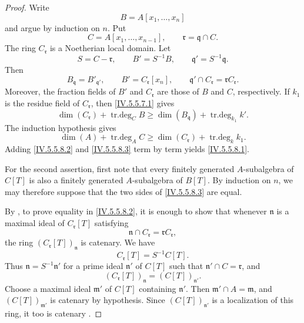 \begin{proof}

Write
\[
B=A[x_1,\ldots,x_n]
\]
and argue by induction on $n$.
Put
\[
C=A[x_1,\ldots,x_{n-1}],
\qquad
\mathfrak r=\mathfrak q\cap C.
\]
The ring $C_{\mathfrak r}$ is a Noetherian local domain.
Let
\[
S=C-\mathfrak r,\qquad
B'=S^{-1}B,\qquad
\mathfrak q'=S^{-1}\mathfrak q.
\]
Then
\[
B_{\mathfrak q}=B'_{\mathfrak q'},
\qquad
B'=C_{\mathfrak r}[x_n],
\qquad
\mathfrak q'\cap C_{\mathfrak r}
  =\mathfrak rC_{\mathfrak r}.
\]
Moreover, the fraction fields of $B'$ and $C_{\mathfrak r}$ are
those of $B$ and $C$, respectively.
If $k_1$ is the residue field of $C_{\mathfrak r}$, then
\eqref{IV.5.5.7.1} gives
\begin{equation}
\dim(C_{\mathfrak r})+\operatorname{tr.deg}_C B
 \geq\dim(B_{\mathfrak q})+\operatorname{tr.deg}_{k_1}k'.
\tag{5.5.8.2}\label{IV.5.5.8.2}
\end{equation}
The induction hypothesis gives
\begin{equation}
\dim(A)+\operatorname{tr.deg}_A C
 \geq\dim(C_{\mathfrak r})+\operatorname{tr.deg}_k k_1.
\tag{5.5.8.3}\label{IV.5.5.8.3}
\end{equation}
Adding \eqref{IV.5.5.8.2} and \eqref{IV.5.5.8.3} term by term yields
\eqref{IV.5.5.8.1}.

For the second assertion, first note that every finitely generated
$A$-subalgebra of $C[T]$ is also a finitely generated
$A$-subalgebra of $B[T]$.
By induction on $n$, we may therefore suppose that the two sides of
\eqref{IV.5.5.8.3} are equal.

By , to prove equality in
\eqref{IV.5.5.8.2}, it is enough to show that whenever
$\mathfrak n$ is a maximal ideal of $C_{\mathfrak r}[T]$ satisfying
\[
\mathfrak n\cap C_{\mathfrak r}
  =\mathfrak rC_{\mathfrak r},
\]
the ring $(C_{\mathfrak r}[T])_{\mathfrak n}$ is catenary.
We have
\[
C_{\mathfrak r}[T]=S^{-1}C[T].
\]
Thus $\mathfrak n=S^{-1}\mathfrak n'$ for a prime ideal
$\mathfrak n'$ of $C[T]$ such that
$\mathfrak n'\cap C=\mathfrak r$, and
\[
(C_{\mathfrak r}[T])_{\mathfrak n}
  =(C[T])_{\mathfrak n'}.
\]
Choose a maximal ideal $\mathfrak m'$ of $C[T]$ containing
$\mathfrak n'$.
Then $\mathfrak m'\cap A=\mathfrak m$, and
$(C[T])_{\mathfrak m'}$ is catenary by hypothesis.
Since $(C[T])_{\mathfrak n'}$ is a localization of this ring, it too
is catenary .
\end{proof}
